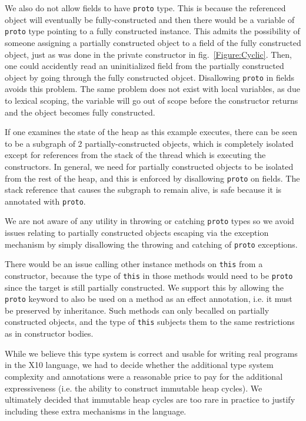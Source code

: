 We also do not allow fields to have \texttt{proto} type.  This is because the
referenced object will eventually be fully-constructed and then there would be
a variable of \texttt{proto} type pointing to a fully constructed instance.
This admits the possibility of someone assigning a partially constructed object
to a field of the fully constructed object, just as was done in the private
constructor in fig.~\ref{Figure:Cyclic}.  Then, one could accidently read an
uninitialized field from the partially constructed object by going through the
fully constructed objcet.  Disallowing \texttt{proto} in fields avoids this
problem.  The same problem does not exist with local variables, as due to
lexical scoping, the variable will go out of scope before the constructor
returns and the object becomes fully constructed.

If one examines the state of the heap as this example executes, there can be
seen to be a subgraph of 2 partially-constructed objects, which is completely
isolated except for references from the stack of the thread which is executing
the constructors.  In general, we need for partially constructed objects to be
isolated from the rest of the heap, and this is enforced by disallowing
\texttt{proto} on fields.  The stack reference that causes the subgraph to
remain alive, is safe because it is annotated with \texttt{proto}.

We are not aware of any utility in throwing or catching \texttt{proto} types so
we avoid issues relating to partially constructed objects escaping via the
exception mechanism by simply disallowing the throwing and catching of
\texttt{proto} exceptions.

There would be an issue calling other instance methods on \texttt{this} from a
constructor, because the type of \texttt{this} in those methods would need to
be \texttt{proto} since the target is still partially constructed.  We support
this by allowing the \texttt{proto} keyword to also be used on a method as an
effect annotation, i.e. it must be preserved by inheritance.  Such methods can
only becalled on partially constructed objects, and the type of \texttt{this}
subjects them to the same restrictions as in constructor bodies.

While we believe this type system is correct and usable for writing real
programs in the X10 language, we had to decide whether the additional type
system complexity and annotations were a reasonable price to pay for the
additional expressiveness (i.e. the ability to construct immutable heap
cycles).  We ultimately decided that immutable heap cycles are too rare in
practice to justify including these extra mechanisms in the language.
